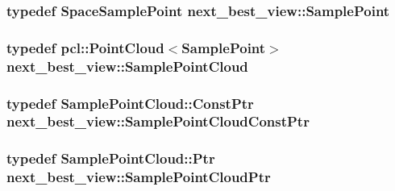 \hypertarget{namespacenext__best__view_a56af5e88564f59e1a7cf1e754ad35ff6}{
\subsubsection[{\-Sample\-Point}]{\setlength{\rightskip}{0pt plus 5cm}typedef {\bf \-Space\-Sample\-Point} {\bf next\-\_\-best\-\_\-view\-::\-Sample\-Point}}}\label{namespacenext__best__view_a56af5e88564f59e1a7cf1e754ad35ff6}
\hypertarget{namespacenext__best__view_a4e69b847b3bd97988ee2907059ba132e}{
\subsubsection[{\-Sample\-Point\-Cloud}]{\setlength{\rightskip}{0pt plus 5cm}typedef pcl\-::\-Point\-Cloud$<${\bf \-Sample\-Point}$>$ {\bf next\-\_\-best\-\_\-view\-::\-Sample\-Point\-Cloud}}}\label{namespacenext__best__view_a4e69b847b3bd97988ee2907059ba132e}
\hypertarget{namespacenext__best__view_a4da3a155b2c3c37ab995df628dbeeafa}{
\subsubsection[{\-Sample\-Point\-Cloud\-Const\-Ptr}]{\setlength{\rightskip}{0pt plus 5cm}typedef \-Sample\-Point\-Cloud\-::\-Const\-Ptr {\bf next\-\_\-best\-\_\-view\-::\-Sample\-Point\-Cloud\-Const\-Ptr}}}\label{namespacenext__best__view_a4da3a155b2c3c37ab995df628dbeeafa}
\hypertarget{namespacenext__best__view_a6351e8a1adb34a715016b1768ad51120}{
\subsubsection[{\-Sample\-Point\-Cloud\-Ptr}]{\setlength{\rightskip}{0pt plus 5cm}typedef \-Sample\-Point\-Cloud\-::\-Ptr {\bf next\-\_\-best\-\_\-view\-::\-Sample\-Point\-Cloud\-Ptr}}}\label{namespacenext__best__view_a6351e8a1adb34a715016b1768ad51120}
